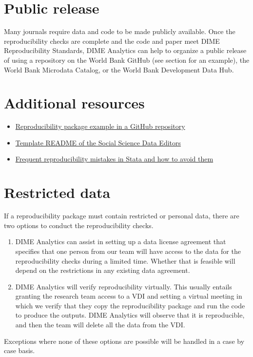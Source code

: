 \begin{fullwidth}
	\bigskip

	\section*{Public release}

	Many journals require data and code to be made publicly available. Once the reproducibility checks are complete and the code and paper meet DIME Reproducibility Standards, DIME Analytics can help to organize a public release of using a repository on the World Bank GitHub (see section  for an example), the World Bank Microdata Catalog, or the World Bank Development Data Hub.

	\section{Additional resources}
	\label{additional-resources}

	\begin{itemize}
		\item \href{https://github.com/worldbank/rio-safe-space}{Reproducibility package example in a GitHub repository}
		\item \href{https://social-science-data-editors.github.io/template_README/template-README.html}{Template README of the Social Science Data Editors}
		\item \href{https://osf.io/agkmc}{Frequent reproducibility mistakes in Stata and how to avoid them}
	\end{itemize}

	\section{Restricted data}
	\label{restricted-data}

	If a reproducibility package must contain restricted or personal data, there are two options to conduct the reproducibility checks.

	\begin{enumerate}
		\item DIME Analytics can assist in setting up a data license agreement that specifies that one person from our team will have access to the data for the reproducibility checks during a limited time. Whether that is feasible will depend on the restrictions in any existing data agreement.
		\item DIME Analytics will verify reproducibility virtually. This usually entails granting the research team access to a VDI and setting a virtual meeting in which we verify that they copy the reproducibility package and run the code to produce the outputs. DIME Analytics will observe that it is reproducible, and then the team will delete all the data from the VDI. 
	\end{enumerate}

	\noindent
	Exceptions where none of these options are possible will be handled in a case by case basis.

	\end{fullwidth}

